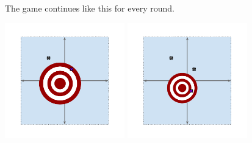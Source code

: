 \documentclass{beamer}
\begin{document}
\begin{frame}
  The game continues like this for every round.
  \begin{center}
    \includegraphics[height=5cm]{images/topdarts_plane_p1}
    \includegraphics[height=5cm]{images/topdarts_plane_p2}
  \end{center}
\end{frame}
\end{document}
